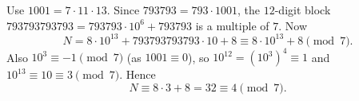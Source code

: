 Use $1001=7\cdot11\cdot13$. Since $793793=793\cdot1001$, the $12$-digit block $793793793793=793793\cdot10^6+793793$ is a multiple of $7$. Now
\[
N=8\cdot10^{13}+793793793793\cdot10+8\equiv8\cdot10^{13}+8\pmod7 .
\]
Also $10^3\equiv-1\pmod7$ (as $1001\equiv0$), so $10^{12}=(10^3)^4\equiv1$ and $10^{13}\equiv10\equiv3\pmod7$. Hence
\[
N\equiv8\cdot3+8=32\equiv\boxed{4}\pmod7 .
\]
